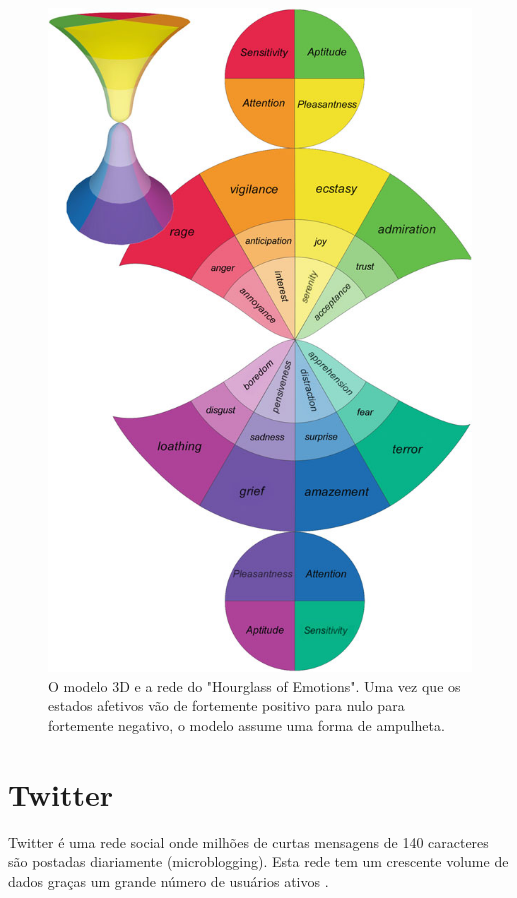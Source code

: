 \documentclass[
	12pt,				%
	openright,			%
	oneside,			%
	a4paper,			%
	english,			%
	spanish,			%
	brazil				%
	]{abntex2}
\begin{document}
\begin{figure}[!h]
\centering
\includegraphics{SenticHourGlass}
\caption {O modelo 3D e a rede do "Hourglass of Emotions". Uma vez que os estados afetivos vão de fortemente positivo para nulo para fortemente negativo, o modelo assume uma forma de ampulheta. \cite{book_Cambria2015}}
\label{SenticHourGlass}
\end{figure}

	\section{Twitter}
	
	Twitter é uma rede social onde milhões de curtas mensagens de 140 caracteres são postadas diariamente (microblogging). Esta rede tem um crescente volume de dados graças um grande número de usuários ativos \cite{conference_twitter_alg}.
\end{document}
